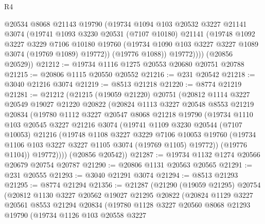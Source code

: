 \begin{lexlean}{R4}
\begin{coremodule}
            @20534
            @8068
            @21143
            @19790
            (@19734
              @1094
              @103
              @20532
              @3227
              @21141
              @3074
              (@19741
                @1093
                @3230
                @20531
                (@7107 @10180)
                @21141
                (@19748
                  @1092
                  @3227
                  @3229
                  @7106
                  @10180
                  @19760
                  (@19734 @1090 @103 @3227 @3227 @1089 @3074 (@19769 @1089) @19772))
                (@19776 @1088))
              @19772))))
      (@20856 @20529))
@21212 := @19734 @1116 @1275 @20553 @20680 @20751 @20788
@21215 := @20806 @1115 @20550 @20552
@21216 := @231 @20542
@21218 := @3040 @21216 @3074
@21219 := @8513 @21218
@21220 := @8774 @21219
@21281 := @21212
    (@21215
      (@19059 @21220)
      @20751
      (@20812
        @1114
        @3227
        @20549
        @19027
        @21220
        @20822
        (@20824
          @1113
          @3227
          @20548
          @8553
          @21219
          @20834
          (@19780
            @1112
            @3227
            @20547
            @8068
            @21218
            @19790
            (@19734
              @1110
              @103
              @20545
              @3227
              @21216
              @3074
              (@19741
                @1109
                @3230
                @20544
                (@7107 @10053)
                @21216
                (@19748
                  @1108
                  @3227
                  @3229
                  @7106
                  @10053
                  @19760
                  (@19734 @1106 @103 @3227 @3227 @1105 @3074 (@19769 @1105) @19772))
                (@19776 @1104))
              @19772))))
      (@20856 @20542))
@21287 := @19734 @1132 @1274 @20566 @20679 @20754 @20787
@21290 := @20806 @1131 @20563 @20565
@21291 := @231 @20555
@21293 := @3040 @21291 @3074
@21294 := @8513 @21293
@21295 := @8774 @21294
@21356 := @21287
    (@21290
      (@19059 @21295)
      @20754
      (@20812
        @1130
        @3227
        @20562
        @19027
        @21295
        @20822
        (@20824
          @1129
          @3227
          @20561
          @8553
          @21294
          @20834
          (@19780
            @1128
            @3227
            @20560
            @8068
            @21293
            @19790
            (@19734
              @1126
              @103
              @20558
              @3227

\end{coremodule}
\end{lexlean}
